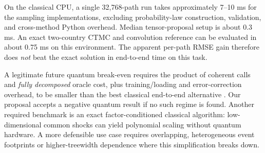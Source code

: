 \documentclass[10pt,conference]{IEEEtran}
\begin{document}
On the classical CPU, a single 32,768-path run takes approximately 7--10 ms for the sampling implementations, excluding probability-law construction, validation, and cross-method Python overhead. Median tensor-proposal setup is about 0.3 ms. An exact two-country CTMC and convolution reference can be evaluated in about 0.75 ms on this environment. The apparent per-path RMSE gain therefore does \emph{not} beat the exact solution in end-to-end time on this task.

A legitimate future quantum break-even requires the product of coherent calls and \emph{fully decomposed} oracle cost, plus training/loading and error-correction overhead, to be smaller than the best classical end-to-end alternative \cite{chakrabarti}. Our proposal accepts a negative quantum result if no such regime is found. Another required benchmark is an exact factor-conditioned classical algorithm: low-dimensional common shocks can yield polynomial scaling without quantum hardware. A more defensible use case requires overlapping, heterogeneous event footprints or higher-treewidth dependence where this simplification breaks down.
\end{document}
